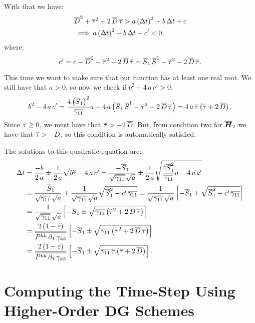 \documentclass[10pt,preprint]{aastex}
\begin{document}
With that we have:
\begin{align}
    &\overline{D}^{2}+\overline{\tau}^{2}+2\,\overline{D}\,\overline{\tau}>a\left(\Delta t\right)^{2}+b\,\Delta t+c\\
    &\implies a\left(\Delta t\right)^{2}+b\,\Delta t+c'<0,
\end{align}
where:
\begin{equation}
  c'=c-\overline{D}^{2}-\overline{\tau}^{2}-2\,\overline{D}\,\overline{\tau}=\overline{S}_{1}\,\overline{S}^{1}-\overline{\tau}^{2}-2\,\overline{D}\,\overline{\tau}.
\end{equation}

This time we want to make sure that our function has at least one real root. We still have that $a>0$, so now we check if $b^{2}-4\,a\,c'>0$:
\begin{equation}
    b^{2}-4\,a\,c'=\frac{4\left(\overline{S}_{1}\right)^{2}}{\overline{\gamma_{11}}}a-4\,a\left(\overline{S}_{1}\,\overline{S}^{1}-\overline{\tau}^{2}-2\,\overline{D}\,\overline{\tau}\right)=4\,a\,\overline{\tau}\left(\overline{\tau}+2\,\overline{D}\right).
\end{equation}
Since $\overline{\tau}\geq0$, we must have that $\overline{\tau}>-2\,\overline{D}$. But, from condition two for $\overline{\boldsymbol{H}}_{2}$ we have that $\overline{\tau}>-\overline{D}$, so this condition is automatically satisfied.

The solutions to this quadratic equation are:
\begin{align}
    \Delta t&=\frac{-b}{2\,a}\pm\frac{1}{2\,a}\sqrt{b^{2}-4\,a\,c'}=\frac{-\overline{S}_{1}}{\sqrt{\overline{\gamma_{11}}}\,\sqrt{a}}\pm\frac{1}{2\,a}\sqrt{\frac{4\overline{S}_{1}^{2}}{\overline{\gamma_{11}}}a-4\,a\,c'}\\
    &=\frac{-\overline{S}_{1}}{\sqrt{\overline{\gamma_{11}}}\,\sqrt{a}}\pm\frac{1}{\sqrt{\overline{\gamma_{11}}}\,\sqrt{a}}\sqrt{\overline{S}_{1}^{2}-c'\,\overline{\gamma_{11}}}=\frac{1}{\sqrt{\overline{\gamma_{11}}}\,\sqrt{a}}\left[-\overline{S}_{1}\pm\sqrt{\overline{S}_{1}^{2}-c'\,\overline{\gamma_{11}}}\right]\\
    &=\frac{1}{\sqrt{\overline{\gamma_{11}}}\,\sqrt{a}}\left[-\overline{S}_{1}\pm\sqrt{\overline{\gamma_{11}}\left(\overline{\tau}^{2}+2\,\overline{D}\,\overline{\tau}\right)}\right]\\
    &=\frac{2\left(1-\varepsilon\right)}{\overline{P^{kk}\,\partial_{1}\,\gamma_{kk}}}\left[-\overline{S}_{1}\pm\sqrt{\overline{\gamma_{11}}\left(\overline{\tau}^{2}+2\,\overline{D}\,\overline{\tau}\right)}\right]\\
    &=\frac{2\left(1-\varepsilon\right)}{\overline{P^{kk}\,\partial_{1}\,\gamma_{kk}}}\left[-\overline{S}_{1}\pm\sqrt{\overline{\gamma_{11}}\,\overline{\tau}\left(\overline{\tau}+2\,\overline{D}\right)}\right].
\end{align}

\section{Computing the Time-Step Using Higher-Order DG Schemes}
\end{document}
